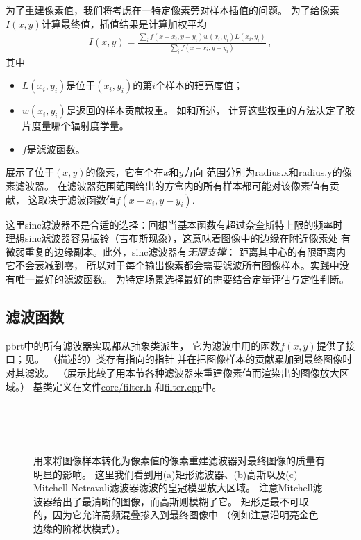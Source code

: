 为了重建像素值，我们将考虑在一特定像素旁对样本插值的问题。
为了给像素$I(x,y)$计算最终值，插值结果是计算加权平均
\begin{align}\label{eq:7.12}
    I(x,y)=\frac{\sum\limits_i {f(x-x_i,y-y_i)w(x_i,y_i)L(x_i,y_i)}}{\sum\limits_i {f(x-x_i,y-y_i)}}\, ,
\end{align}
其中
\begin{itemize}
    \item $L(x_i,y_i)$是位于$(x_i,y_i)$的第$i$个样本的辐亮度值；
    \item $w(x_i,y_i)$是返回的样本贡献权重。
          如和所述，
          计算这些权重的方法决定了胶片度量哪个辐射度学量。
    \item $f$是滤波函数。
\end{itemize}

展示了位于$(x,y)$的像素，它有个在$x$和$y$方向
范围分别为{\ttfamily radius.x}和{\ttfamily radius.y}的像素滤波器。
在滤波器范围范围给出的方盒内的所有样本都可能对该像素值有贡献，
这取决于滤波函数值$f(x-x_i,y-y_i)$.

这里sinc滤波器不是合适的选择：回想当基本函数有超过奈奎斯特上限的频率时
理想sinc滤波器容易振铃（吉布斯现象），这意味着图像中的边缘在附近像素处
有微弱重复的边缘副本。此外，sinc滤波器有\emph{无限支撑}：
距离其中心的有限距离内它不会衰减到零，
所以对于每个输出像素都会需要滤波所有图像样本。实践中没有唯一最好的滤波函数。
为特定场景选择最好的需要结合定量评估与定性判断。

\subsection{滤波函数}\label{sub:滤波函数}
pbrt中的所有滤波器实现都从抽象类派生，
它为滤波中用的函数$f(x,y)$提供了接口；见。
（描述的）类存有指向的指针
并在把图像样本的贡献累加到最终图像时对其滤波。
（展示比较了用本节各种滤波器来重建像素值而渲染出的图像放大区域。）
基类定义在文件\href{https://github.com/mmp/pbrt-v3/blob/master/src/core/filter.h}{\ttfamily core/filter.h}
和\href{https://github.com/mmp/pbrt-v3/blob/master/src/core/filter.cpp}{\ttfamily filter.cpp}中。
\begin{figure}[htbp]
    \centering
    \\
    \\
    \\
    \caption{用来将图像样本转化为像素值的像素重建滤波器对最终图像的质量有明显的影响。
        这里我们看到用(a)矩形滤波器、(b)高斯以及(c) Mitchell-Netravali滤波器滤波的皇冠模型放大区域。
        注意Mitchell滤波器给出了最清晰的图像，而高斯则模糊了它。
        矩形是最不可取的，因为它允许高频混叠掺入到最终图像中
        （例如注意沿明亮金色边缘的阶梯状模式）。}
    \label{fig:7.39}
\end{figure}

